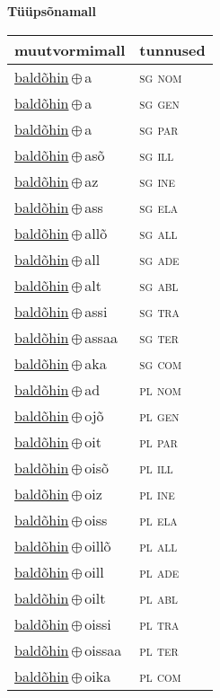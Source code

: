 

\vspace{3.5em}
\noindent \begin{minipage}{\textwidth}
\noindent \textbf{Tüüpsõnamall \,}\\

\begin{sideways}
\begin{tabular}{l l}
muutvormimall & tunnused \\
\hline
\underline{baldõhin}\,$\oplus$\,a & \textsc{ sg nom } \\
\underline{baldõhin}\,$\oplus$\,a & \textsc{ sg gen } \\
\underline{baldõhin}\,$\oplus$\,a & \textsc{ sg par } \\
\underline{baldõhin}\,$\oplus$\,asõ & \textsc{ sg ill } \\
\underline{baldõhin}\,$\oplus$\,az & \textsc{ sg ine } \\
\underline{baldõhin}\,$\oplus$\,ass & \textsc{ sg ela } \\
\underline{baldõhin}\,$\oplus$\,allõ & \textsc{ sg all } \\
\underline{baldõhin}\,$\oplus$\,all & \textsc{ sg ade } \\
\underline{baldõhin}\,$\oplus$\,alt & \textsc{ sg abl } \\
\underline{baldõhin}\,$\oplus$\,assi & \textsc{ sg tra } \\
\underline{baldõhin}\,$\oplus$\,assaa & \textsc{ sg ter } \\
\underline{baldõhin}\,$\oplus$\,aka & \textsc{ sg com } \\
\underline{baldõhin}\,$\oplus$\,ad & \textsc{ pl nom } \\
\underline{baldõhin}\,$\oplus$\,ojõ & \textsc{ pl gen } \\
\underline{baldõhin}\,$\oplus$\,oit & \textsc{ pl par } \\
\underline{baldõhin}\,$\oplus$\,oisõ & \textsc{ pl ill } \\
\underline{baldõhin}\,$\oplus$\,oiz & \textsc{ pl ine } \\
\underline{baldõhin}\,$\oplus$\,oiss & \textsc{ pl ela } \\
\underline{baldõhin}\,$\oplus$\,oillõ & \textsc{ pl all } \\
\underline{baldõhin}\,$\oplus$\,oill & \textsc{ pl ade } \\
\underline{baldõhin}\,$\oplus$\,oilt & \textsc{ pl abl } \\
\underline{baldõhin}\,$\oplus$\,oissi & \textsc{ pl tra } \\
\underline{baldõhin}\,$\oplus$\,oissaa & \textsc{ pl ter } \\
\underline{baldõhin}\,$\oplus$\,oika & \textsc{ pl com } \\
\end{tabular}
\end{sideways}
\label{tab:tüüpsõnamall-baldõhina}

\end{minipage}

